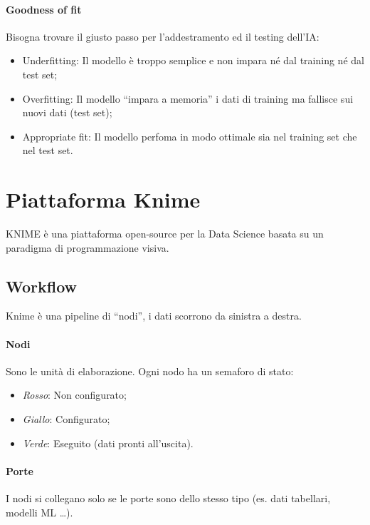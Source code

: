 \paragraph{Goodness of fit} Bisogna trovare il giusto passo per l'addestramento ed il testing dell'IA:
\begin{itemize}
    \item Underfitting: Il modello è troppo semplice e non impara né dal training né dal test set;
    \item Overfitting: Il modello ``impara a memoria'' i dati di training ma fallisce sui nuovi dati (test set);
    \item Appropriate fit: Il modello perfoma in modo ottimale sia nel training set che nel test set.
\end{itemize}

%
\section{Piattaforma Knime}
KNIME è una piattaforma open-source per la Data Science basata su un paradigma di programmazione visiva.
%
\subsection{Workflow}
Knime è una pipeline di ``nodi'', i dati scorrono da sinistra a destra.
%
\paragraph{Nodi} Sono le unità di elaborazione. Ogni nodo ha un semaforo di stato:
\begin{itemize}
    \item \emph{Rosso}: Non configurato;
    \item \emph{Giallo}: Configurato;
    \item \emph{Verde}: Eseguito (dati pronti all'uscita).
\end{itemize}

%
\paragraph{Porte} I nodi si collegano solo se le porte sono dello stesso tipo (es. dati tabellari, modelli ML \dots).

%
